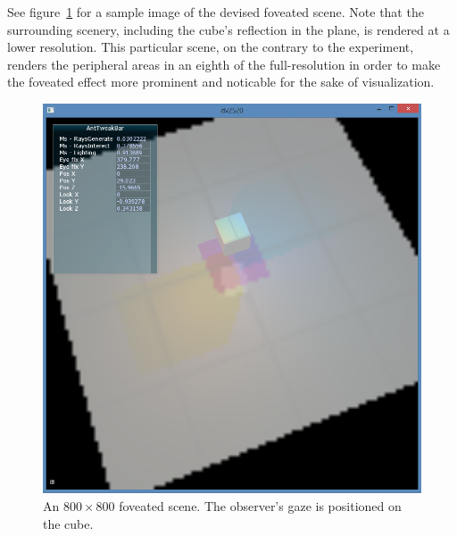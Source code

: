 See figure~\ref{fig:fov} for a sample image of the devised foveated scene.
Note that the surrounding scenery, including the cube's reflection in the plane, is rendered at a lower resolution.
This particular scene, on the contrary to the experiment, renders the peripheral areas in an eighth of the full-resolution in order to make the foveated effect more prominent and noticable for the sake of visualization.

\begin{figure}[p]
  \centering
  \includegraphics[width=1.0\linewidth]{img/fov_rt_et.png}
  \caption{An $800\times 800$ foveated scene. The observer's gaze is positioned on the cube.}
  \label{fig:fov}
\end{figure}
